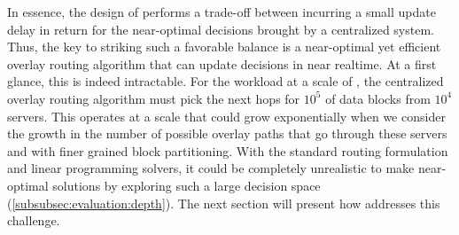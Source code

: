 In essence, the design of \name performs a trade-off between incurring
a small update delay in return for the near-optimal 
decisions brought by a centralized system. Thus, the key to striking such a 
favorable balance is a near-optimal yet efficient overlay routing 
algorithm that can update decisions in near realtime. At a first 
glance, this is indeed intractable. For the workload at a scale of 
\company, the centralized overlay routing algorithm must pick the next 
hops for $10^5$ of data blocks from $10^4$ servers. This operates at a scale that 
could grow exponentially when we consider the growth in the number of possible 
overlay paths that go through these servers and with  finer grained 
block partitioning. With the standard routing formulation and linear 
programming solvers, it could be completely unrealistic to make 
near-optimal solutions by exploring such a large decision space 
(\Section\ref{subsubsec:evaluation:depth}).
The next section will present how \name addresses this challenge.

